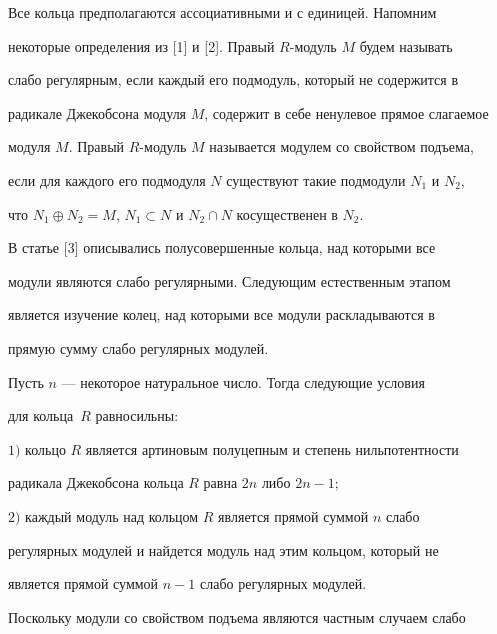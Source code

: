 Все кольца предполагаются ассоциативными и с единицей. Напомним 


некоторые определения из [1] и [2]. Правый $R$-модуль $M$ будем  называть 


слабо регулярным, если каждый его подмодуль, который не содержится в 


радикале Джекобсона модуля $M$, содержит в себе ненулевое прямое слагаемое


модуля $M$. Правый $R$-модуль $M$ называется модулем со свойством подъема,


если для каждого его подмодуля $N$ существуют такие подмодули $N_1$ и $N_2$,


что $N_1\oplus N_2=M$, $N_1\subset N$ и $N_2\cap N$ косущественен в $N_2$. 





В статье [3] описывались полусовершенные кольца, над которыми все 


модули являются слабо регулярными. Следующим естественным этапом


является изучение колец, над которыми все модули раскладываются в 


прямую сумму слабо регулярных модулей. 





\begin{thm}


Пусть $n$ --- некоторое натуральное число. Тогда следующие условия 


для кольца~$R$ равносильны\/${:}$  





$1)$ кольцо $R$  является артиновым полуцепным и степень нильпотентности


радикала Джекобсона кольца $R$  равна $2n$ либо $2n-1;$  





$2)$ каждый модуль над кольцом $R$ является прямой суммой $n$  слабо 


регулярных модулей и найдется модуль над этим кольцом, который не 


является прямой суммой  $n-1$ слабо регулярных модулей.


\end{thm}





Поскольку модули со свойством подъема являются частным случаем слабо 


